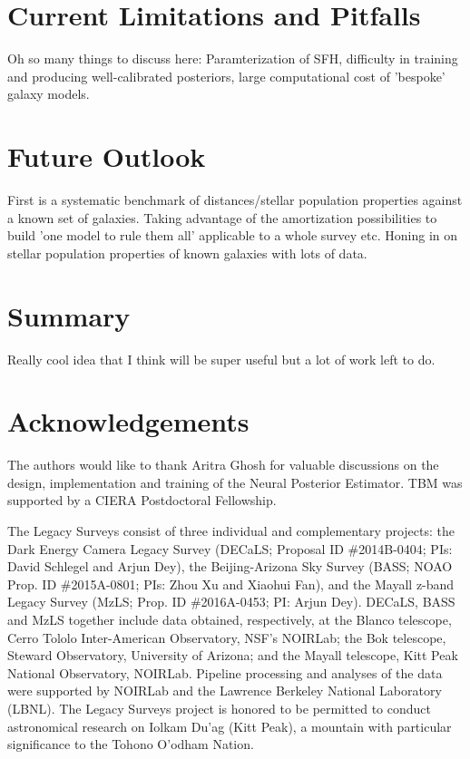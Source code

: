 \documentclass[twocolumn]{aastex631}
\begin{document}
\section{Current Limitations and Pitfalls}
\label{sec:issues}
Oh so many things to discuss here: Paramterization of SFH, difficulty in training and producing well-calibrated posteriors, large computational cost of 'bespoke' galaxy models.

\section{Future Outlook}
\label{sec:future}
First is a systematic benchmark of distances/stellar population properties against a known set of galaxies. Taking advantage of the amortization possibilities to build 'one model to rule them all' applicable to a whole survey etc. Honing in on stellar population properties of known galaxies with lots of data.

\section{Summary}
\label{sec:summary}
Really cool idea that I think will be super useful but a lot of work left to do.

\section*{Acknowledgements}
The authors would like to thank Aritra Ghosh for valuable discussions on the design, implementation and training of the Neural Posterior Estimator. TBM was supported by a CIERA Postdoctoral Fellowship.

The Legacy Surveys consist of three individual and complementary projects: the Dark Energy Camera Legacy Survey (DECaLS; Proposal ID \#2014B-0404; PIs: David Schlegel and Arjun Dey), the Beijing-Arizona Sky Survey (BASS; NOAO Prop. ID \#2015A-0801; PIs: Zhou Xu and Xiaohui Fan), and the Mayall z-band Legacy Survey (MzLS; Prop. ID \#2016A-0453; PI: Arjun Dey). DECaLS, BASS and MzLS together include data obtained, respectively, at the Blanco telescope, Cerro Tololo Inter-American Observatory, NSF’s NOIRLab; the Bok telescope, Steward Observatory, University of Arizona; and the Mayall telescope, Kitt Peak National Observatory, NOIRLab. Pipeline processing and analyses of the data were supported by NOIRLab and the Lawrence Berkeley National Laboratory (LBNL). The Legacy Surveys project is honored to be permitted to conduct astronomical research on Iolkam Du’ag (Kitt Peak), a mountain with particular significance to the Tohono O’odham Nation.
\end{document}
